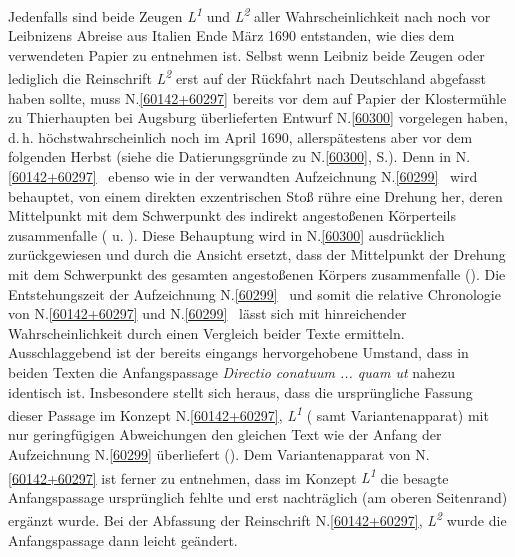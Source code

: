 Jedenfalls sind beide Zeugen \textit{L\textsuperscript{1}} und \textit{L\textsuperscript{2}} aller Wahrscheinlichkeit nach noch vor Leibnizens Abreise aus Italien Ende März 1690 entstanden, wie dies dem verwendeten Papier zu entnehmen ist.
Selbst wenn Leibniz beide Zeugen oder lediglich die Reinschrift \textit{L\textsuperscript{2}} erst auf der Rückfahrt nach Deutschland abgefasst haben sollte, muss N.\;\ref{60142+60297} bereits vor dem auf Papier der Klostermühle zu Thierhaupten bei Augsburg überlieferten Entwurf N.\;\ref{60300} vorgelegen haben, d.\,h. höchstwahrscheinlich noch im April 1690, allerspätestens aber vor dem folgenden Herbst (siehe die Datierungsgründe zu N.\;\ref{60300}, S.\;\pageref{LH_37_05_044_datierung}).
Denn in N.\;\ref{60142+60297} \textendash\ ebenso wie in der verwandten Aufzeichnung N.\;\ref{60299} \textendash\ wird behauptet, von einem direkten exzentrischen Stoß rühre eine Drehung her, deren Mittelpunkt mit dem Schwerpunkt des indirekt angestoßenen Körperteils zusammenfalle ( u. ).
Diese Behauptung wird in N.\;\ref{60300} ausdrücklich zurückgewiesen und durch die Ansicht ersetzt, dass der Mittelpunkt der Drehung mit dem Schwerpunkt des gesamten angestoßenen Körpers zusammenfalle ().
\pend%
\pstart%
Die Entstehungszeit der Aufzeichnung N.\;\ref{60299} \textendash\ und somit die relative Chronologie von N.\;\ref{60142+60297} und N.\;\ref{60299} \textendash\ lässt sich mit hinreichender Wahrscheinlichkeit durch einen Vergleich beider Texte ermitteln.
Ausschlaggebend ist der bereits eingangs hervorgehobene Umstand, dass in beiden Texten die Anfangspassage \textit{Directio conatuum ... quam ut} nahezu identisch ist.
Insbesondere stellt sich heraus, dass die ursprüngliche Fassung dieser Passage im Konzept N.\;\ref{60142+60297}, \textit{L\textsuperscript{1}} ( samt Variantenapparat) mit nur geringfügigen Abweichungen den gleichen Text wie der Anfang der Aufzeichnung N.\;\ref{60299} überliefert ().
Dem Variantenapparat von N.\;\ref{60142+60297} ist ferner zu entnehmen, dass im Konzept \textit{L\textsuperscript{1}} die besagte Anfangspassage ursprünglich fehlte und erst nachträglich (am oberen Seitenrand) ergänzt wurde.
Bei der Abfassung der Reinschrift N.\;\ref{60142+60297}, \textit{L\textsuperscript{2}} wurde die Anfangspassage dann leicht geändert.

